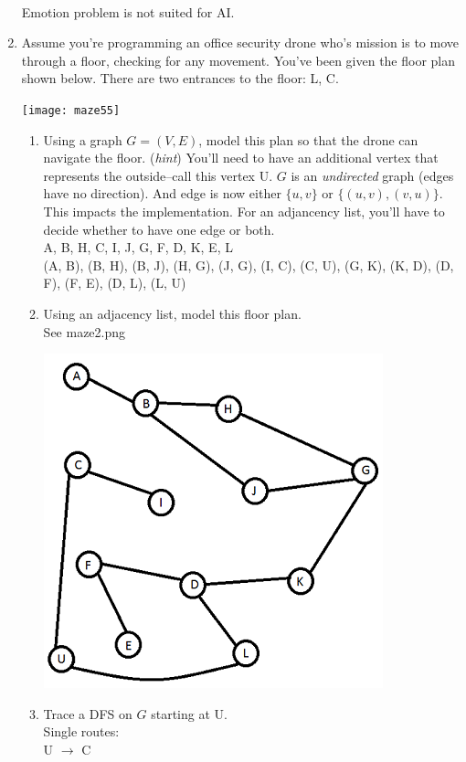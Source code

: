 \documentclass{article}
\begin{document}
\begin{enumerate}
\\ Emotion problem is not suited for AI.
\item Assume you're programming an office security drone who's mission is to move through a floor, checking for any movement.  You've been given the floor plan shown below.  There are two entrances to the floor: \textsf{L, C}.  
\begin{center}
\texttt{[image: maze55]}
\end{center}
\begin{enumerate}
\item Using a graph $ G = (V,E)$, model this plan so that the drone can navigate the floor.  ({\it hint}) You'll need to have an additional vertex that represents the outside--call this vertex \textsf{U}.  $G$ is  an {\it undirected} graph (edges have no direction).  And edge is now either $\{u,v\}$ or $\{(u,v), (v,u)\}$.  This impacts the implementation.    For an adjancency list, you'll have to decide whether to have one edge or both. 
\\ {A, B, H, C, I, J, G, F, D, K, E, L}
\\ {(A, B), (B, H), (B, J), (H, G), (J, G), (I, C), (C, U), (G, K), (K, D), (D, F), (F, E), (D, L), (L, U)}
\item Using an adjacency list, model this floor plan.
\\See maze2.png
\begin{center}
\includegraphics[scale=0.40]{maze2}
\end{center}
\item Trace a DFS on $G$ starting at \textsf{U}.
\\ Single routes:
\\ U $\rightarrow$ C

\end{enumerate}
\end{enumerate}
\end{document}
